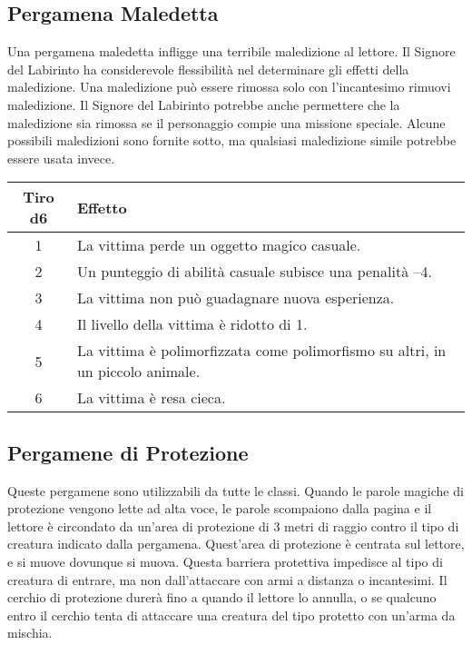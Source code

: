 \documentclass{article}
\begin{document}
\begin{multicols}{2}
\begin{table}[h]
\end{table}

\subsection{Pergamena Maledetta}

Una pergamena maledetta infligge una terribile maledizione al lettore. Il Signore del Labirinto ha considerevole flessibilità nel determinare gli effetti della maledizione. Una maledizione può essere rimossa solo con l'incantesimo rimuovi maledizione. Il Signore del Labirinto potrebbe anche permettere che la maledizione sia rimossa se il personaggio compie una missione speciale. Alcune possibili maledizioni sono fornite sotto, ma qualsiasi maledizione simile potrebbe essere usata invece.

\begin{table}[h]
\centering
\begin{tabular}{|c|l|}
\hline
\textbf{Tiro d6} & \textbf{Effetto} \\
\hline
1 & La vittima perde un oggetto magico casuale. \\
2 & Un punteggio di abilità casuale subisce una penalità –4. \\
3 & La vittima non può guadagnare nuova esperienza. \\
4 & Il livello della vittima è ridotto di 1. \\
5 & La vittima è polimorfizzata come polimorfismo su altri, in un piccolo animale. \\
6 & La vittima è resa cieca. \\
\hline
\end{tabular}

\end{table}

\subsection{Pergamene di Protezione}

Queste pergamene sono utilizzabili da tutte le classi. Quando le parole magiche di protezione vengono lette ad alta voce, le parole scompaiono dalla pagina e il lettore è circondato da un'area di protezione di 3 metri di raggio contro il tipo di creatura indicato dalla pergamena. Quest'area di protezione è centrata sul lettore, e si muove dovunque si muova. Questa barriera protettiva impedisce al tipo di creatura di entrare, ma non dall'attaccare con armi a distanza o incantesimi. Il cerchio di protezione durerà fino a quando il lettore lo annulla, o se qualcuno entro il cerchio tenta di attaccare una creatura del tipo protetto con un'arma da mischia.


\end{multicols}
\end{document}
